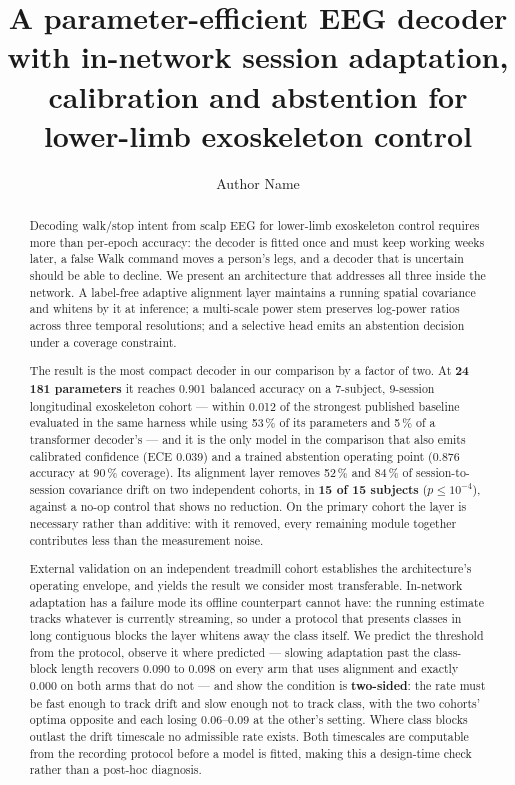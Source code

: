 \documentclass[preprint,12pt]{elsarticle}
\begin{document}
\begin{frontmatter}

\title{A parameter-efficient EEG decoder with in-network session adaptation,
calibration and abstention for lower-limb exoskeleton control}

\author[inst1]{Author Name}

\begin{abstract}
Decoding walk/stop intent from scalp EEG for lower-limb exoskeleton control
requires more than per-epoch accuracy: the decoder is fitted once and must keep
working weeks later, a false Walk command moves a person's legs, and a decoder
that is uncertain should be able to decline. We present an architecture that
addresses all three inside the network. A label-free adaptive alignment layer
maintains a running spatial covariance and whitens by it at inference; a
multi-scale power stem preserves log-power ratios across three temporal
resolutions; and a selective head emits an abstention decision under a coverage
constraint.

The result is the most compact decoder in our comparison by a factor of two.
At \textbf{24\,181 parameters} it reaches 0.901 balanced accuracy on a
7-subject, 9-session longitudinal exoskeleton cohort --- within 0.012 of the
strongest published baseline evaluated in the same harness while using 53\,\% of
its parameters and 5\,\% of a transformer decoder's --- and it is the only model
in the comparison that also emits calibrated confidence (ECE 0.039) and a trained
abstention operating point (0.876 accuracy at 90\,\% coverage). Its alignment
layer removes 52\,\% and 84\,\% of session-to-session covariance drift on two
independent cohorts, in \textbf{15 of 15 subjects} ($p \le 10^{-4}$), against a
no-op control that shows no reduction. On the primary cohort the layer is
necessary rather than additive: with it removed, every remaining module together
contributes less than the measurement noise.

External validation on an independent treadmill cohort establishes the
architecture's operating envelope, and yields the result we consider most
transferable. In-network adaptation has a failure mode its offline counterpart
cannot have: the running estimate tracks whatever is currently streaming, so
under a protocol that presents classes in long contiguous blocks the layer
whitens away the class itself. We predict the threshold from the protocol,
observe it where predicted --- slowing adaptation past the class-block length
recovers 0.090 to 0.098 on every arm that uses alignment and exactly 0.000 on
both arms that do not --- and show the condition is \textbf{two-sided}: the rate
must be fast enough to track drift and slow enough not to track class, with the
two cohorts' optima opposite and each losing 0.06--0.09 at the other's setting.
Where class blocks outlast the drift timescale no admissible rate exists. Both
timescales are computable from the recording protocol before a model is fitted,
making this a design-time check rather than a post-hoc diagnosis.
\end{abstract}


\end{frontmatter}
\end{document}
